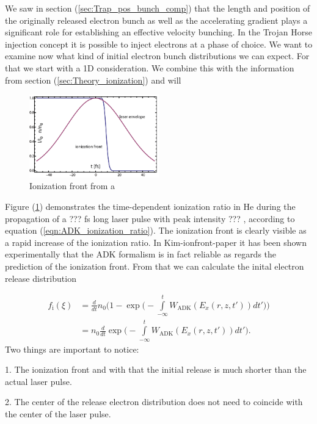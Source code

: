 We saw in section (\ref{sec:Trap_pos_bunch_comp}) that the length and position of the originally released electron bunch as well as the accelerating gradient plays a significant role for establishing an effective velocity bunching. In the Trojan Horse injection concept it is possible to inject electrons at a phase of choice. We want to examine now what kind of initial electron bunch distributions we can expect. For that we start with a 1D consideration. We combine this with the information from section (\ref{sec:Theory_ionization}) and will 

\begin{figure}[h]
\begin{center}
\includegraphics[width=0.5\textwidth]{theory/images/raw/Ionization_front.png}
\end{center}
\caption{Ionization front from a}
\label{img:ion_front_norm}
\end{figure}
Figure (\ref{img:ion_front_norm}) demonstrates the time-dependent ionization ratio in He during the propagation of a ??? fs long laser pulse with peak intensity ??? , according to equation (\ref{eqn:ADK_ionization_ratio}).
The ionization front is clearly visible as a rapid increase of the ionization ratio. 
In Kim-ionfront-paper  it has been shown experimentally that the ADK formalism is in fact reliable as regards the prediction of the ionization front. From that we can calculate the inital electron release distribution

\begin{align}
\label{eqn:ADK_ionization_ratio_dt}
f_\mathrm{i}(\xi)&= \frac{d}{dt}n_0 \Big(1-\exp\Big(-\int \limits_{-\infty}^t W_\mathrm{ADK}(E_{x}(r,z,t'))dt'\Big)\Big)\\
&=n_0 \frac{d}{dt}\exp\Big(-\int \limits_{-\infty}^t W_\mathrm{ADK}(E_{x}(r,z,t'))dt'\Big).
\end{align}
Two things are important to notice:

1. The ionization front and with that the initial release is much shorter than the actual laser pulse.

2. The center of the release electron distribution does not need to coincide with the center of the laser pulse.


